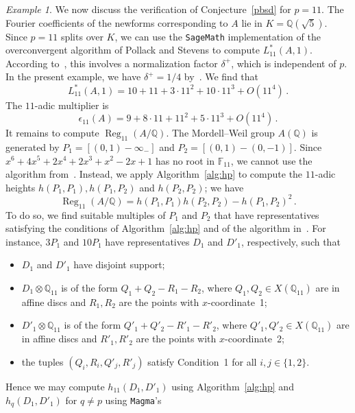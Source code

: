 \documentclass[11pt, a4paper]{amsart}
\newcommand{\Q}{\mathbb{Q}}
\newcommand{\F}{\mathbb{F}}
\newcommand{\Reg}{\operatorname{Reg}}
\theoremstyle{remark}
\newtheorem{example}[theorem]{Example}
\numberwithin{equation}{section}
\begin{document}
\begin{example}
  We now discuss the verification of Conjecture~\ref{pbsd} for $p=11$.
  The Fourier coefficients of the newforms corresponding to $A$ lie in
  $K=\Q(\sqrt{5})$. 
  Since $p=11$ splits over $K$, we can use the {\tt SageMath} implementation of
  the overconvergent algorithm of Pollack and Stevens to compute
  $L_{11}^*(A,1)$. According to~\cite[Table 4.4]{BMS16}, this involves a 
  normalization factor $\delta^+$, which is independent of $p$. In the present example, we have $\delta^+=1/4$ by~\cite[Table~4.4]{BMS16}. We find that
  \begin{equation}\label{l11}
    L_{11}^*(A,1) = 10 + 11 + 3\cdot 11^2 + 10\cdot 11^3 + O(11^4)\,.
  \end{equation}
  The $11$-adic multiplier is
  \begin{equation}\label{eps11}
  \epsilon_{11}(A)=9 + 8\cdot 11 + 11^2 + 5\cdot 11^3 + O(11^4)\,.
  \end{equation}
  It remains to compute $\Reg_{11}(A/\Q)$. The Mordell--Weil group $A(\Q)$
  is generated by $P_1 = [(0,1) - \infty_-]$ and $P_2 = [(0,1)-(0,-1)]$.
  Since $ x^6+4x^5+2x^4+2x^3+x^2-2x+1$ has no root in
  $\F_{11}$, we cannot use the algorithm from~\cite{BBHeights}.
  Instead, we apply Algorithm~\ref{alg:hp} to compute the $11$-adic heights
  $h(P_1,P_1), h(P_1,P_2)$ and $h(P_2,P_2)$; we have 
$$
  \Reg_{11}(A/\Q) = h(P_1,P_1)h(P_2,P_2)-h(P_1,P_2)^2\,.
$$
  To do so, we find suitable multiples of $P_1$ and $P_2$ 
that have representatives
  satisfying the
  conditions of Algorithm~\ref{alg:hp} and of the algorithm
  in~\cite{Mul14}.
  For instance, $3P_1$ and $10P_1$ have representatives $D_{1}$ and $D'_1$,
  respectively, such that 
  \begin{itemize}
    \item $D_1$ and $D'_1$ have disjoint support;
    \item $D_1\otimes \Q_{11}$ is of the form $Q_1+Q_2-R_1-R_2$, where
      $Q_1,Q_2\in X(\Q_{11})$ are in affine discs and $R_{1}, R_2$ are the
      points with $x$-coordinate~1; 
    \item $D'_1\otimes \Q_{11}$ is of the form $Q'_1+Q'_2-R'_1-R'_2$, where
      $Q'_1,Q'_2\in X(\Q_{11})$ are in affine discs and $R'_1, R'_2$ are the
      points with $x$-coordinate~2; 
    \item the tuples $(Q_i,R_i, Q'_j, R'_j)$ satisfy Condition~1
      for all $i,j\in \{1,2\}$.
  \end{itemize}
  Hence we may compute $h_{11}(D_1,D'_1)$ using Algorithm~\ref{alg:hp} and
  $h_{q}(D_1,D'_1)$ for $q\ne p$ using {\tt Magma}'s {\tt 
}
\end{example}
\end{document}
